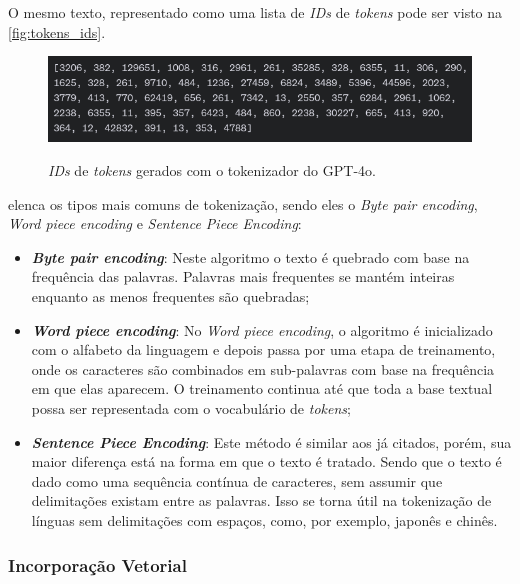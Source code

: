 O mesmo texto, representado como uma lista de \textit{IDs} de \textit{tokens} pode ser visto na \autoref{fig:tokens_ids}.

\begin{figure}[ht]
      \centering
      \caption{\small \textit{IDs} de \textit{tokens} gerados com o tokenizador do \ac{GPT}-4o.}
      \includegraphics[width=0.7\columnwidth,keepaspectratio]{images/tokens_ids.png}
      \label{fig:tokens_ids}
\end{figure}

\textcite{llm_survey_2024} elenca os tipos mais comuns de tokenização, sendo eles o \textit{Byte pair encoding}, \textit{Word piece encoding} e
\textit{Sentence Piece Encoding}:

\begin{itemize}
      \item \textbf{\textit{Byte pair encoding}}: Neste algoritmo o texto é quebrado com base na frequência das palavras. Palavras mais frequentes se mantém inteiras
            enquanto as menos frequentes são quebradas;
      \item \textbf{\textit{Word piece encoding}}: No \textit{Word piece encoding}, o algoritmo é inicializado com o alfabeto da linguagem e depois passa por uma etapa
            de treinamento, onde os caracteres são combinados em sub-palavras com base na frequência em que elas aparecem. O treinamento continua até que toda a base
            textual possa ser representada com o vocabulário de \textit{tokens};
      \item \textbf{\textit{Sentence Piece Encoding}}: Este método é similar aos já citados, porém, sua maior diferença está na forma em que o texto é tratado. Sendo
            que o texto é dado como uma sequência contínua de caracteres, sem assumir que delimitações existam entre as palavras. Isso se torna útil na tokenização de
            línguas sem delimitações com espaços, como, por exemplo, japonês e chinês.
\end{itemize}

\subsubsection{Incorporação Vetorial}

